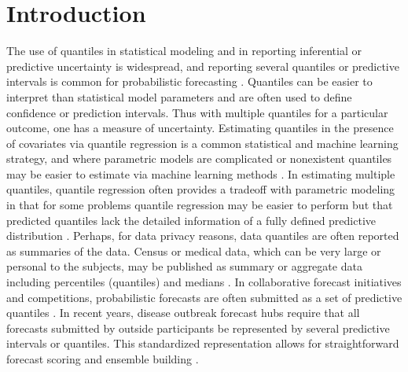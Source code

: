 \section{Introduction} \label{seq:intro}

The use of quantiles in statistical modeling and in reporting inferential or 
predictive uncertainty is widespread, and reporting several quantiles or 
predictive intervals is common for probabilistic forecasting 
\cite[]{gneiting2023model}. Quantiles can be easier to interpret than 
statistical model parameters and are often used to define confidence or 
prediction intervals. Thus with multiple quantiles for a particular outcome, 
one has a measure of uncertainty.
Estimating quantiles in the presence of covariates via 
quantile regression is a common
statistical and machine learning strategy, and where parametric models are 
complicated or nonexistent quantiles may be easier to estimate via machine 
learning methods \cite[]{martin2022direct,chung2021beyond, koenker2017quantile, 
koenker1978regression}. In estimating multiple quantiles, quantile regression 
often provides a tradeoff with parametric modeling in that for some problems 
quantile regression may be easier to perform but that predicted quantiles lack 
the detailed information of a fully defined predictive distribution 
\cite[]{pohle2020murphy}. 
Perhaps, for data privacy reasons, data quantiles are often reported as 
summaries of the data.
Census or medical data, which can be very large or personal to the subjects, 
may be published as summary or aggregate data including percentiles (quantiles) 
and medians 
\cite[]{simpson2023interpolating,cdc2022growthcharts,nirwan2020bayesian}. In 
collaborative forecast initiatives and competitions, probabilistic forecasts 
are often submitted as a set of predictive quantiles 
\cite[]{gneiting2023model,hong2016probabilistic}. In recent years, disease 
outbreak forecast hubs require that all forecasts submitted by outside 
participants be represented by  several predictive intervals or quantiles. 
This standardized representation allows for straightforward forecast scoring 
and ensemble building 
\cite[]{mathis2024evaluation,mathis2023flusight,Cramer2022-hub-dataset,
cramer2022evaluation,sherratt2023predictive,bracher2021evaluating}.
 
